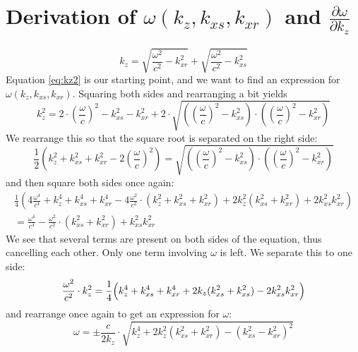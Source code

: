 \documentclass{article}%
\begin{document}
\section{Derivation of $\omega(k_z,k_{xs},k_{xr})$ and $\frac{\partial \omega}{\partial k_z}$}
\label{sec:derOkz}
\begin{equation}
	k_z = \sqrt{\frac{\omega^2}{c^2} - k_{xr}^2} + \sqrt{\frac{\omega^2}{c^2} - k_{xs}^2}
\label{eq:kz2}
\end{equation}
Equation \ref{eq:kz2} is our starting point, and we want to find an expression for $\omega(k_z,k_{xs},k_{xr})$. Squaring both sides and rearranging a bit yields
\begin{equation}
	k_z^2 = 2 \cdot \left(\frac{\omega}{c} \right)^2 - k_{xs}^2 - k_{xr}^2 
		+ 2 \cdot \sqrt{\left( \left(\frac{\omega}{c} \right)^2 - k_{xs}^2 \right)
		\cdot \left( \left(\frac{\omega}{c} \right)^2 - k_{xr}^2 \right)}
\label{eq:}
\end{equation}
We rearrange this so that the square root is separated on the right side:
\begin{equation}
 	\frac{1}{2} \left(k_z^2 + k_{xs}^2 + k_{xr}^2 - 2 \left(\frac{\omega}{c} \right)^2 \right) = 
 	\sqrt{\left( \left(\frac{\omega}{c} \right)^2 - k_{xs}^2 \right)
		\cdot \left( \left(\frac{\omega}{c} \right)^2 - k_{xr}^2 \right)}
\label{eq:}
\end{equation}
and then square both sides once again:
\begin{multline}
	\frac{1}{4} \left( 4 \frac{\omega^4}{c^4} + k_z^4 + k_{xs}^4 + k_{xr}^4
		- 4\frac{\omega^2}{c^2} \cdot \left( k_z^2 + k_{xs}^2 + k_{xr}^2 \right)
		+ 2k_z^2 \left(k_{xs}^2 + k_{xr}^2 \right) + 2 k_{xs}^2 k_{xr}^2
		\right) \\
		= \frac{\omega^4}{c^4} - \frac{\omega^2}{c^2}\cdot \left(k_{xs}^2 + k_{xr}^2 \right)
		+ k_{xs}^2 k_{xr}^2
\label{eq:}
\end{multline}
We see that several terms are present on both sides of the equation, thus cancelling each other. Only one term involving $\omega$ is left. We separate this to one side:
\begin{equation}
	\frac{\omega^2}{c^2}\cdot k_z^2 = 
		\frac{1}{4} \Bigl(k_z^4 + k_{xs}^4 + k_{xr}^4 + 2k_z(k_{xs}^2 + k_{xs}^2) 
			- 2k_{xs}^2 k_{xr}^2  \Bigr)
\label{eq:}
\end{equation}
and rearrange once again to get an expression for $\omega$:
\begin{equation}
	\omega = \pm \frac{c}{2k_z} \cdot \sqrt{k_z^4 + 2k_z^2(k_{xs}^2 + k_{xr}^2) - (k_{xs}^2-k_{xr}^2)^2}
\label{eq:}
\end{equation}
\end{document}
